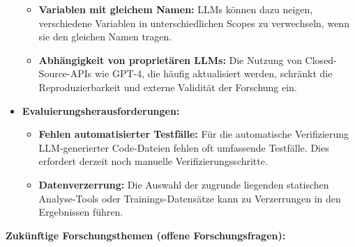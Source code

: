 \begin{itemize}
\begin{itemize}
        \item \textbf{Variablen mit gleichem Namen:} LLMs können dazu neigen, verschiedene Variablen in unterschiedlichen Scopes zu verwechseln, wenn sie den gleichen Namen tragen.
        \item \textbf{Abhängigkeit von proprietären LLMs:} Die Nutzung von Closed-Source-APIs wie GPT-4, die häufig aktualisiert werden, schränkt die Reproduzierbarkeit und externe Validität der Forschung ein.
    \end{itemize}
    \item \textbf{Evaluierungsherausforderungen:}
    \begin{itemize}
        \item \textbf{Fehlen automatisierter Testfälle:} Für die automatische Verifizierung LLM-generierter Code-Dateien fehlen oft umfassende Testfälle. Dies erfordert derzeit noch manuelle Verifizierungsschritte.
        \item \textbf{Datenverzerrung:} Die Auswahl der zugrunde liegenden statischen Analyse-Tools oder Trainings-Datensätze kann zu Verzerrungen in den Ergebnissen führen.
    \end{itemize}
\end{itemize}

\textbf{Zukünftige Forschungsthemen (offene Forschungsfragen):}


